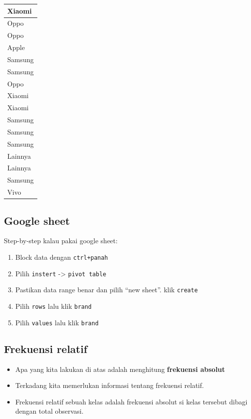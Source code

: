 \documentclass[
  letterpaper,
  DIV=11,
  numbers=noendperiod]{scrartcl}
\providecommand{\tightlist}{%
  \setlength{\itemsep}{0pt}\setlength{\parskip}{0pt}}\usepackage{longtable,booktabs,array}
\begin{document}
\begin{table}
\begin{tabular}[t]{l}
\hline
Xiaomi\\
\hline
Oppo\\
\hline
Oppo\\
\hline
Apple\\
\hline
Samsung\\
\hline
Samsung\\
\hline
Oppo\\
\hline
Xiaomi\\
\hline
Xiaomi\\
\hline
Samsung\\
\hline
Samsung\\
\hline
Samsung\\
\hline
Lainnya\\
\hline
Lainnya\\
\hline
Samsung\\
\hline
Vivo\\
\hline
\end{tabular}
\end{table}

\hypertarget{google-sheet}{%
\subsection{Google sheet}\label{google-sheet}}

Step-by-step kalau pakai google sheet:

\begin{enumerate}
\def\labelenumi{\arabic{enumi}.}
\tightlist
\item
  Block data dengan \texttt{ctrl+panah}
\item
  Pilih \texttt{instert} -\textgreater{} \texttt{pivot\ table}
\item
  Pastikan data range benar dan pilih ``new sheet''. klik
  \texttt{create}
\item
  Pilih \texttt{rows} lalu klik \texttt{brand}
\item
  Pilih \texttt{values} lalu klik \texttt{brand}
\end{enumerate}

\hypertarget{frekuensi-relatif}{%
\subsection{Frekuensi relatif}\label{frekuensi-relatif}}

\begin{itemize}
\item
  Apa yang kita lakukan di atas adalah menghitung \textbf{frekuensi
  absolut}
\item
  Terkadang kita memerlukan informasi tentang frekuensi relatif.
\item
  Frekuensi relatif sebuah kelas adalah frekuensi absolut si kelas
  tersebut dibagi dengan total observasi.
\end{itemize}
\end{document}
